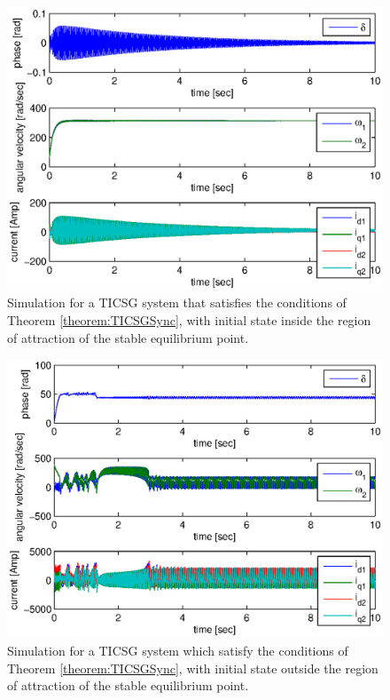 \documentclass[letterpaper,10pt,conference]{ieeeconf}
\begin{document}
\begin{figure}[ht]
\includegraphics[scale=0.65]{InROATICSGSimulation}
\caption{Simulation for a TICSG system that satisfies the conditions
of Theorem \ref{theorem:TICSGSync}, with initial state inside the 
region of attraction of the stable equilibrium point.}
\label{fig:InROATICSGSimulation}
\end{figure}

\begin{figure}[ht]
\includegraphics[scale=0.65]{OutROATICSGSimulation}

\caption{Simulation for a TICSG system which satisfy the conditions of
Theorem \ref{theorem:TICSGSync}, with initial state outside the region
of attraction of the stable equilibrium point.}
\label{fig:OutROATICSGSimulation}
\end{figure}
\end{document}
